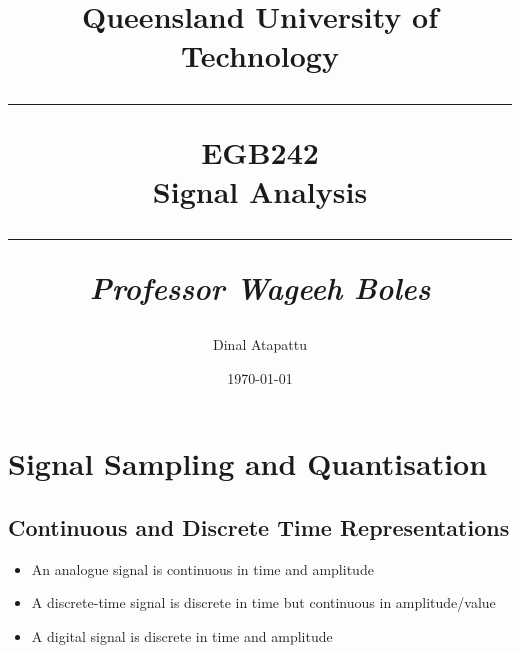 \documentclass[oneside]{book}
\begin{document}
\pagestyle{fancy}
    \fancyhf{}
\fancyhead[R]{\nouppercase{\leftmark}}
\renewcommand{\footrulewidth}{0.4pt}
    \title{
            Queensland University of Technology\\
            \rule{\linewidth}{0.5pt}
        \centering
        \textbf{EGB242} \\
        Signal Analysis\\
        \vspace{0.4cm}
        \rule{\linewidth}{1.5pt}
        \small{\textit{Professor Wageeh Boles}}
    }
    \author{Dinal Atapattu}
    \date{\today}
    \maketitle
    \thispagestyle{empty}
    \tableofcontents
    \chapter{Signal Sampling and Quantisation}
        \section{Continuous and Discrete Time Representations}
            \begin{itemize}
                \item An analogue signal is continuous in time and amplitude
                \item A discrete-time signal is discrete in time but continuous in amplitude/value
                \item A digital signal is discrete in time and amplitude
            \end{itemize}
\end{document}
